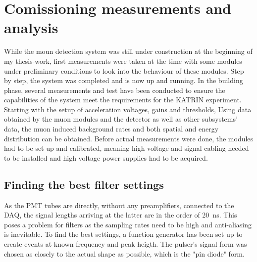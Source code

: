 %

\chapter{Comissioning measurements and analysis}
\label{ch:Analysis}

  While the moun detection system was still under construction at the beginning of my thesis-work, first measurements were taken at the time with some modules under preliminary conditions to look into the behaviour of these modules. Step by step, the system was completed and is now up and running. In the building phase, several measurements and test have been conducted to ensure the capabilities of the system meet the requirements for the KATRIN experiment. Starting with the setup of acceleration voltages, gains and thresholds, 
  Using data obtained by the muon modules and the detector as well as other subsystems' data, the muon induced background rates and both spatial and energy distribution can be obtained. Before actual measurements were done, the modules had to be set up and calibrated, meaning high voltage and signal cabling needed to be installed and high voltage power supplies had to be acquired.
   
  
  
  
  \section{Finding the best filter settings}
  \label{ch:Analysis:sec:Finding the best filter settings}
 
  
  As the PMT tubes are directly, without any preamplifiers, connected to the DAQ, the signal lengths arriving at the latter are in the order of \SI{20}{\nano\second}. This poses a problem for filters as the sampling rates need to be high and anti-aliasing is inevitable. To find the best settings, a function generator has been set up to create events at known frequency and peak heigth. The pulser's signal form  was chosen as closely to the actual shape as possible, which is the "pin diode" form.
 
